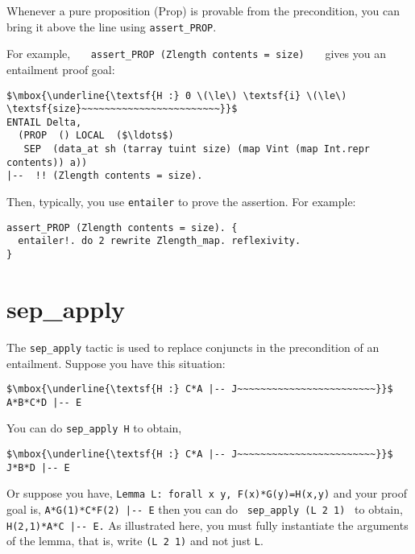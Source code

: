 \documentclass[12pt,fleqn,openany,oneside,showtrims]{memoir}
\begin{document}
Whenever a pure proposition (\textsf{Prop}) is provable from the precondition, you can bring it above the line using \lstinline{assert_PROP}.

For example, ~~~\lstinline{assert_PROP (Zlength contents = size)}~~~
gives you an entailment proof goal:

\begin{lstlisting}
$\mbox{\underline{\textsf{H :} 0 \(\le\) \textsf{i} \(\le\) \textsf{size}~~~~~~~~~~~~~~~~~~~~~~~~}}$
ENTAIL Delta,
  (PROP  () LOCAL  ($\ldots$)
   SEP  (data_at sh (tarray tuint size) (map Vint (map Int.repr contents)) a))
|--  !! (Zlength contents = size).
\end{lstlisting}

Then, typically, you use \lstinline{entailer} to prove the assertion.
For example:

\begin{lstlisting}
assert_PROP (Zlength contents = size). {
  entailer!. do 2 rewrite Zlength_map. reflexivity.
}
\end{lstlisting}


\chapter{sep\_apply}
\label{refcard:sep-apply}

The \lstinline{sep_apply} tactic is used to replace conjuncts in the
precondition of an entailment.
Suppose you have this situation:

\begin{lstlisting}
$\mbox{\underline{\textsf{H :} C*A |-- J~~~~~~~~~~~~~~~~~~~~~~~~}}$
A*B*C*D |-- E
\end{lstlisting}

You can do \lstinline{sep_apply H} to obtain,

\begin{lstlisting}
$\mbox{\underline{\textsf{H :} C*A |-- J~~~~~~~~~~~~~~~~~~~~~~~~}}$
J*B*D |-- E
\end{lstlisting}

Or suppose you have,\quad  
\lstinline{Lemma L: forall x y, F(x)*G(y)=H(x,y)} \newline
and your proof goal is, \quad   \lstinline{A*G(1)*C*F(2) |-- E} \newline
then you can do ~\lstinline{sep_apply (L 2 1)}~ to obtain,
\quad \lstinline{H(2,1)*A*C |-- E.} \newline
As illustrated here, you must fully instantiate the arguments of the
lemma, that is, write \lstinline{(L 2 1)} and not just \lstinline{L}.
\end{document}
